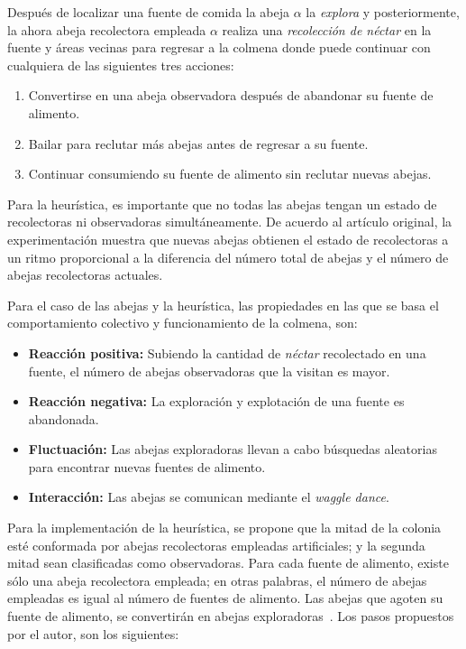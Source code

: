 Después de localizar una fuente de comida la abeja $\alpha$ la \textit{explora}
y posteriormente, la ahora abeja recolectora empleada $\alpha$ realiza una
\textit{recolección de néctar} en la fuente y áreas vecinas para regresar a la
colmena donde puede continuar con cualquiera de las siguientes tres acciones:

\begin{enumerate}
\item Convertirse en una abeja observadora después de abandonar su fuente de alimento.

\item Bailar para reclutar más abejas antes de regresar a su fuente.

\item Continuar consumiendo su fuente de alimento sin reclutar nuevas abejas.
\end{enumerate}

Para la heurística, es importante que no todas las abejas tengan un estado de
recolectoras ni observadoras simultáneamente. De acuerdo al artículo original, la
experimentación muestra que nuevas abejas obtienen el estado de recolectoras
a un ritmo proporcional a la diferencia del número total de abejas y el número
de abejas recolectoras actuales.

Para el caso de las abejas y la heurística, las propiedades en las que se basa
el comportamiento colectivo y funcionamiento de la colmena, son:

\begin{itemize}
\item \textbf{Reacción positiva:} Subiendo la cantidad de \textit{néctar}
recolectado en una fuente, el número de abejas observadoras que la visitan es
mayor.

\item \textbf{Reacción negativa:} La exploración y explotación de una fuente es
abandonada.

\item \textbf{Fluctuación:} Las abejas exploradoras llevan a cabo búsquedas aleatorias
para encontrar nuevas fuentes de alimento.

\item \textbf{Interacción:} Las abejas se comunican mediante el \textit{waggle dance}.

\end{itemize}

Para la implementación de la heurística, se propone que la mitad de la colonia
esté conformada por abejas recolectoras empleadas artificiales; y la segunda
mitad sean clasificadas como observadoras. Para cada fuente de alimento, existe
sólo una abeja recolectora empleada; en otras palabras, el número de abejas
empleadas es igual al número de fuentes de alimento. Las abejas que agoten su
fuente de alimento, se convertirán en abejas exploradoras~\cite{karaboga2005idea}.
 Los pasos propuestos por el autor, son los siguientes:

